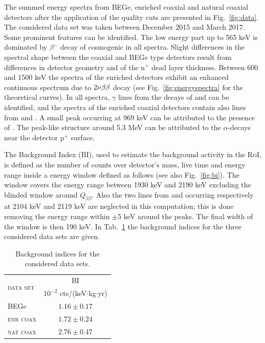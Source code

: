  The summed energy spectra from BEGe, enriched coaxial and natural coaxial detectors after the application of the quality cuts are presented in Fig.~\ref{fig:data}. The considered data set was taken between December 2015 and March 2017. Some prominent features can be identified. The low energy part up to 565 keV is dominated by $\beta^-$ decay of cosmogenic  in all spectra. Slight differences in the spectral shape between the coaxial and BEGe type detectors result from differences in detector geometry and of the n$^+$ dead layer thickness. Between 600 and 1500 keV the spectra of the enriched detectors exhibit an enhanced continuous spectrum due to $2\nu\beta\beta$ decay (see Fig.~\ref{fig:energyspectra} for the theoretical curves). In all spectra, $\gamma$ lines from the decays of  and  can be identified, and the spectra of the enriched coaxial detectors contain also lines from  and . A small peak occurring at 969 keV can be attributed to the presence of . The peak-like structure around 5.3 MeV can be attributed to the $\alpha$-decays near the detector p$^+$ surface.

 The Background Index (BI), used to estimate the background activity in the \textsc{RoI}, is defined as the number of counts over detector's mass, live time and energy range inside a energy window defined as follows (see also Fig.~\ref{fig:bi}). The window covers the energy range between 1930 keV and 2190 keV excluding the blinded window around $Q_{\beta\beta}$. Also the two lines from  and  occurring respectively at 2104 keV and 2119 keV are neglected in this computation; this is done removing the energy range within $\pm$5 keV around the peaks. The final width of the window is then 190 keV. In Tab.~\ref{tab:bindex} the background indices for the three considered data sets are given.
\begin{table}[b]
	\centering
	\caption{Background indices for the considered data sets.}
	\label{tab:bindex}
	\begin{tabular}{lc}
		\toprule
		\multirow{2}{*}{\textsc{data set}}	&	BI \\
											&	$10^{-2}$ cts/(keV$\cdot$kg$\cdot$yr) \\
		\midrule
		BEGe								&	$1.16\pm0.17$	\\
		\textsc{enr coax}					&	$1.72\pm0.24$	\\
		\textsc{nat coax}					&	$2.76\pm0.47$	\\
		\bottomrule
	\end{tabular}
\end{table}

